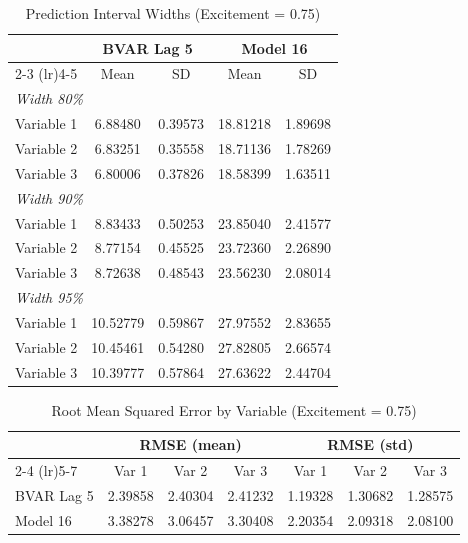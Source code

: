\begin{table}[htbp]
\centering
\caption{Prediction Interval Widths (Excitement = 0.75)}
\label{tab:width_0p75}
\begin{tabular}{lcccc}
\toprule
 & \multicolumn{2}{c}{BVAR Lag 5} & \multicolumn{2}{c}{Model 16} \\
\cmidrule(lr){2-3} \cmidrule(lr){4-5}
 & Mean & SD & Mean & SD \\
\midrule
\multicolumn{5}{l}{\textit{Width 80\%}} \\
Variable 1 & 6.88480 & 0.39573 & 18.81218 & 1.89698 \\
Variable 2 & 6.83251 & 0.35558 & 18.71136 & 1.78269 \\
Variable 3 & 6.80006 & 0.37826 & 18.58399 & 1.63511 \\
\multicolumn{5}{l}{\textit{Width 90\%}} \\
Variable 1 & 8.83433 & 0.50253 & 23.85040 & 2.41577 \\
Variable 2 & 8.77154 & 0.45525 & 23.72360 & 2.26890 \\
Variable 3 & 8.72638 & 0.48543 & 23.56230 & 2.08014 \\
\multicolumn{5}{l}{\textit{Width 95\%}} \\
Variable 1 & 10.52779 & 0.59867 & 27.97552 & 2.83655 \\
Variable 2 & 10.45461 & 0.54280 & 27.82805 & 2.66574 \\
Variable 3 & 10.39777 & 0.57864 & 27.63622 & 2.44704 \\
\bottomrule
\end{tabular}
\end{table}

\begin{table}[htbp]
\centering
\caption{Root Mean Squared Error by Variable (Excitement = 0.75)}
\label{tab:rmse_0p75}
\begin{tabular}{lcccccc}
\toprule
 & \multicolumn{3}{c}{RMSE (mean)} & \multicolumn{3}{c}{RMSE (std)} \\
\cmidrule(lr){2-4} \cmidrule(lr){5-7}
 & Var 1 & Var 2 & Var 3 & Var 1 & Var 2 & Var 3 \\
\midrule
BVAR Lag 5 & 2.39858 & 2.40304 & 2.41232 & 1.19328 & 1.30682 & 1.28575 \\
Model 16 & 3.38278 & 3.06457 & 3.30408 & 2.20354 & 2.09318 & 2.08100 \\
\bottomrule
\end{tabular}
\end{table}

